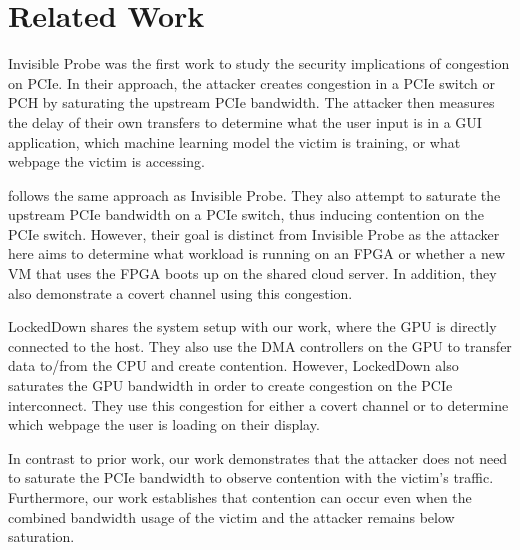 \section{Related Work}
\label{sec:interconnect-sc-related-work}

Invisible Probe \cite{tan2021invisible} was the first work to study the security implications of congestion on PCIe.
In their approach, the attacker creates congestion in a PCIe switch or PCH by saturating the upstream PCIe bandwidth.
The attacker then measures the delay of their own transfers to determine what the user input is in a GUI application, which machine learning model the victim is training, or what webpage the victim is accessing.

\citet{giechaskiel2022cross} follows the same approach as Invisible Probe.
They also attempt to saturate the upstream PCIe bandwidth on a PCIe switch, thus inducing contention on the PCIe switch.
However, their goal is distinct from Invisible Probe as the attacker here aims to determine what workload is running on an FPGA or whether a new VM that uses the FPGA boots up on the shared cloud server.
In addition, they also demonstrate a covert channel using this congestion.

LockedDown \cite{side2022lockeddown} shares the system setup with our work, where the GPU is directly connected to the host.
They also use the DMA controllers on the GPU to transfer data to/from the CPU and create contention.
However, LockedDown also saturates the GPU bandwidth in order to create congestion on the PCIe interconnect.
They use this congestion for either a covert channel or to determine which webpage the user is loading on their display.

In contrast to prior work, our work demonstrates that the attacker does not need to saturate the PCIe bandwidth to observe contention with the victim's traffic. 
Furthermore, our work establishes that contention can occur even when the combined bandwidth usage of the victim and the attacker remains below saturation.